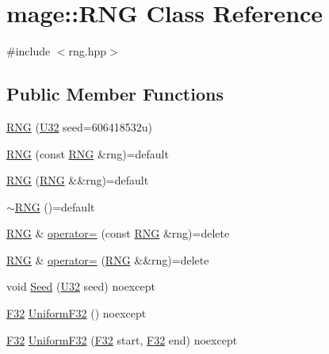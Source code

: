 \hypertarget{classmage_1_1_r_n_g}{}\section{mage\+:\+:R\+NG Class Reference}
\label{classmage_1_1_r_n_g}


{\ttfamily \#include $<$rng.\+hpp$>$}

\subsection*{Public Member Functions}
\begin{DoxyCompactItemize}
\item 
\mbox{\hyperlink{classmage_1_1_r_n_g_a381a917dce1f2d319859b700a4410ffc}{R\+NG}} (\mbox{\hyperlink{namespacemage_aa5d6eaabaac3cdd01873d6a3d27e90f3}{U32}} seed=606418532u)
\item 
\mbox{\hyperlink{classmage_1_1_r_n_g_ae85dd3ab6679a308610880779d65955a}{R\+NG}} (const \mbox{\hyperlink{classmage_1_1_r_n_g}{R\+NG}} \&rng)=default
\item 
\mbox{\hyperlink{classmage_1_1_r_n_g_aea109c4ab1644a5294d7c2c1031a50c9}{R\+NG}} (\mbox{\hyperlink{classmage_1_1_r_n_g}{R\+NG}} \&\&rng)=default
\item 
\mbox{\hyperlink{classmage_1_1_r_n_g_a20d24aabf31837e48a38b9ca221b0a9b}{$\sim$\+R\+NG}} ()=default
\item 
\mbox{\hyperlink{classmage_1_1_r_n_g}{R\+NG}} \& \mbox{\hyperlink{classmage_1_1_r_n_g_a38a0a4296338162fe105012cb4d13318}{operator=}} (const \mbox{\hyperlink{classmage_1_1_r_n_g}{R\+NG}} \&rng)=delete
\item 
\mbox{\hyperlink{classmage_1_1_r_n_g}{R\+NG}} \& \mbox{\hyperlink{classmage_1_1_r_n_g_ac9155db13a3d4b7f44a4f800085197a2}{operator=}} (\mbox{\hyperlink{classmage_1_1_r_n_g}{R\+NG}} \&\&rng)=delete
\item 
void \mbox{\hyperlink{classmage_1_1_r_n_g_a1d7bc2fd5525a252d4900f5dd4754162}{Seed}} (\mbox{\hyperlink{namespacemage_aa5d6eaabaac3cdd01873d6a3d27e90f3}{U32}} seed) noexcept
\item 
\mbox{\hyperlink{namespacemage_aa97e833b45f06d60a0a9c4fc22ae02c0}{F32}} \mbox{\hyperlink{classmage_1_1_r_n_g_a94e3e2dc84e277c3dba004da386941f9}{Uniform\+F32}} () noexcept
\item 
\mbox{\hyperlink{namespacemage_aa97e833b45f06d60a0a9c4fc22ae02c0}{F32}} \mbox{\hyperlink{classmage_1_1_r_n_g_a16e2f397e2473e790877ccaf6e249612}{Uniform\+F32}} (\mbox{\hyperlink{namespacemage_aa97e833b45f06d60a0a9c4fc22ae02c0}{F32}} start, \mbox{\hyperlink{namespacemage_aa97e833b45f06d60a0a9c4fc22ae02c0}{F32}} end) noexcept
\end{DoxyCompactItemize}
